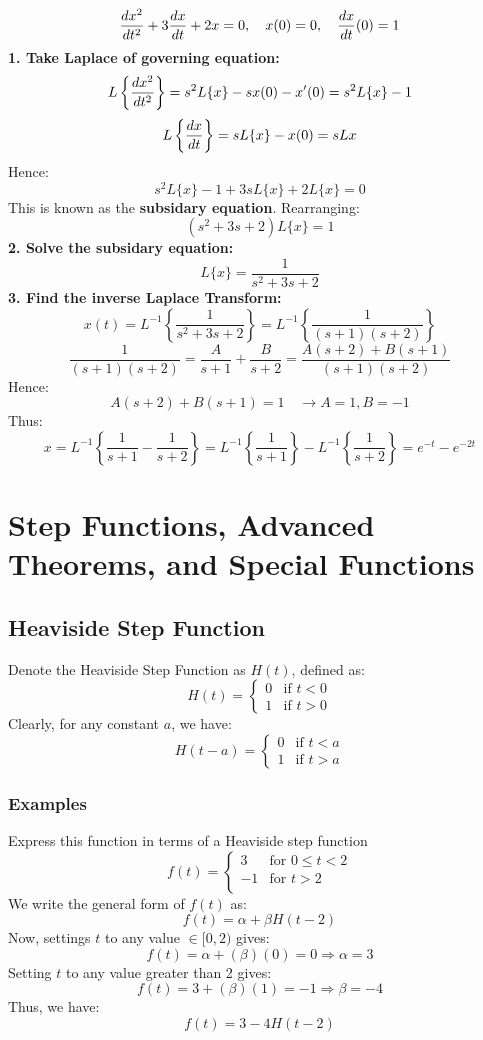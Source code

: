 \documentclass[a4paper, 10pt]{article}
\begin{document}
\begin{examplebox}{}{}
  \normalsize $$\frac{dx^2}{dt^2} + 3\frac{dx}{dt} + 2x = 0, \quad x(0) = 0, \quad \frac{dx}{dt}(0) = 1$$
  \textbf{1. Take Laplace of governing equation:}
  $$L\left\{\frac{dx^2}{dt^2}\right\} = s^2 L\{x\} - sx(0) - x'(0) = s^2 L\{x\} - 1$$
  $$L\left\{\frac{dx}{dt}\right\} = sL\{x\} - x(0) = sL{x}$$
  Hence:
  $$s^2 L\{x\} - 1 + 3sL\{x\} + 2L\{x\} = 0$$
  This is known as the \textbf{subsidary equation}. Rearranging:
  $$(s^2 + 3s + 2)L\{x\} = 1$$
  \textbf{2. Solve the subsidary equation:}
  $$L\{x\} = \frac{1}{s^2 + 3s + 2}$$
  \textbf{3. Find the inverse Laplace Transform:}
  $$x(t) = L^{-1} \left\{ \frac{1}{s^2 + 3s + 2} \right\} = L^{-1} \left\{ \frac{1}{(s+1)(s+2)}\right\} $$
  $$\frac{1}{(s+1)(s+2)} = \frac{A}{s+1} + \frac{B}{s+2} = \frac{A(s+2) + B(s+1)}{(s+1)(s+2)}$$
  Hence:
  $$A(s+2) + B(s+1) = 1 \quad \rightarrow A = 1, B = -1$$
  Thus:
  $$x = L^{-1} \left\{\frac{1}{s+1} - \frac{1}{s+2}\right\} = L^{-1} \left\{ \frac{1}{s+1}\right\}  - L^{-1}\left\{ \frac{1}{s+2}\right\} = e^{-t} - e^{-2t}$$
\end{examplebox}
\pagebreak
\section{Step Functions, Advanced Theorems, and Special Functions}
\subsection{Heaviside Step Function}
Denote the Heaviside Step Function as $H(t)$, defined as:
$$
  H(t) = \begin{cases}
    0 & \text{if } t < 0 \\
    1 & \text{if } t > 0
  \end{cases}
$$
Clearly, for any constant $a$, we have:
$$
  H(t-a) = \begin{cases}
    0 & \text{if } t < a \\
    1 & \text{if } t > a
  \end{cases}
$$

\subsubsection{Examples}

\begin{examplebox}{Express this function in terms of a Heaviside step function}{}
  $$f(t) = \begin{cases}
      3  & \text{for } 0 \leq t < 2 \\
      -1 & \text{for } t > 2        \\
    \end{cases}$$
  We write the general form of $f(t)$ as:
  $$f(t) = \alpha + \beta H(t-2)$$
  Now, settings $t$ to any value $\in [0,2)$ gives:
  $$f(t) = \alpha + (\beta)(0) = 0 \Rightarrow \alpha = 3$$
  Setting $t$ to any value greater than 2 gives:
  $$f(t) = 3 + (\beta)(1) = -1 \Rightarrow \beta = -4 $$
  Thus, we have:
  $$f(t) = 3 - 4H(t-2)$$
\end{examplebox}
\end{document}

